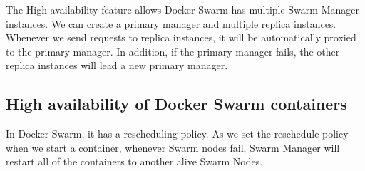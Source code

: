 The High availability feature allows Docker Swarm has multiple Swarm Manager instances. We can create a primary manager and multiple replica instances.
Whenever we send requests to replica instances, it will be automatically proxied to the primary manager.
In addition, if the primary manager fails, the other replica instances will lead a new primary manager.

\subsection{High availability of Docker Swarm containers}
In Docker Swarm, it has a rescheduling policy. As we set the reschedule policy when we start a container, whenever Swarm nodes fail, Swarm Manager will restart all of the containers to another alive Swarm Nodes.
